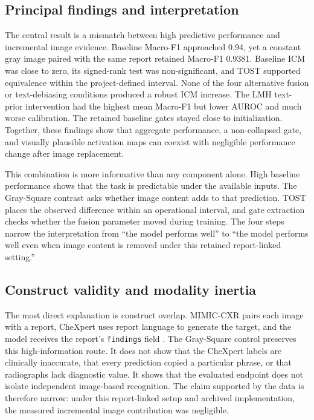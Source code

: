 \documentclass[10pt,a4paper,twocolumn]{article}
\begin{document}
\subsection{Principal findings and interpretation}\label{sec:principal}

The central result is a mismatch between high predictive performance and
incremental image evidence. Baseline Macro-F1 approached 0.94, yet a constant
gray image paired with the same report retained Macro-F1 0.9381. Baseline ICM
was close to zero, its signed-rank test was non-significant, and TOST supported
equivalence within the project-defined interval. None of the four alternative
fusion or text-debiasing conditions produced a robust ICM increase. The LMH
text-prior intervention had the highest mean Macro-F1 but lower AUROC and much
worse calibration. The retained baseline gates stayed close to initialization.
Together, these findings show that aggregate performance, a non-collapsed gate,
and visually plausible activation maps can coexist with negligible performance
change after image replacement.

This combination is more informative than any component alone. High baseline
performance shows that the task is predictable under the available inputs. The
Gray-Square contrast asks whether image content adds to that prediction. TOST
places the observed difference within an operational interval, and gate
extraction checks whether the fusion parameter moved during training. The four
steps narrow the interpretation from ``the model performs well'' to ``the model
performs well even when image content is removed under this retained
report-linked setting.''

\subsection{Construct validity and modality inertia}\label{sec:construct}

The most direct explanation is construct overlap. MIMIC-CXR pairs each image
with a report, CheXpert uses report language to generate the target, and the
model receives the report's \texttt{findings} field
\cite{johnson2019mimiccxr,irvin2019chexpert}. The Gray-Square control preserves
this high-information route. It does not show that the CheXpert labels are
clinically inaccurate, that every prediction copied a particular phrase, or that
radiographs lack diagnostic value. It shows that the evaluated endpoint does
not isolate independent image-based recognition. The claim supported by the
data is therefore narrow: under this report-linked setup and archived
implementation, the measured incremental image contribution was negligible.
\end{document}
